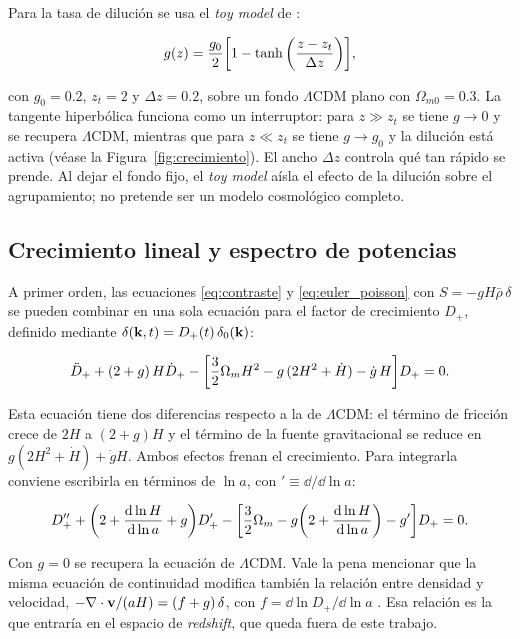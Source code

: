\documentclass[letterpaper, 12pt]{article}
\newcommand{\LCDM}{\Lambda\mathrm{CDM}}
\begin{document}
            Para la tasa de dilución se usa el \emph{toy model} de \cite{aviles_ferrara}:

            \begin{equation}\label{eq:toy}
                g(z) = \frac{g_0}{2}\qty[1 - \tanh\qty(\frac{z - z_t}{\Delta z})],
            \end{equation}

            con $g_0 = 0.2$, $z_t = 2$ y $\Delta z = 0.2$, sobre un fondo $\LCDM$ plano con $\Omega_{m0} = 0.3$. La tangente hiperbólica funciona como un interruptor: para $z \gg z_t$ se tiene $g \to 0$ y se recupera $\LCDM$, mientras que para $z \ll z_t$ se tiene $g \to g_0$ y la dilución está activa (véase la Figura~\ref{fig:crecimiento}). El ancho $\Delta z$ controla qué tan rápido se prende. Al dejar el fondo fijo, el \emph{toy model} aísla el efecto de la dilución sobre el agrupamiento; no pretende ser un modelo cosmológico completo.

        \subsection{Crecimiento lineal y espectro de potencias}

            A primer orden, las ecuaciones \eqref{eq:contraste} y \eqref{eq:euler_poisson} con $S = -gH\bar\rho\,\delta$ se pueden combinar en una sola ecuación para el factor de crecimiento $D_+$, definido mediante $\delta(\vb{k},t) = D_+(t)\,\delta_0(\vb{k})$:

            \begin{equation}\label{eq:crecimiento_t}
                \ddot D_+ + (2+g)\,H\dot D_+ - \qty[\frac{3}{2}\Omega_m H^2 - g\,(2H^2 + \dot H) - \dot g\,H] D_+ = 0.
            \end{equation}

            Esta ecuación tiene dos diferencias respecto a la de $\LCDM$: el término de fricción crece de $2H$ a $(2+g)H$ y el término de la fuente gravitacional se reduce en $g(2H^2 + \dot H) + \dot g H$. Ambos efectos frenan el crecimiento. Para integrarla conviene escribirla en términos de $\ln a$, con $' \equiv \dd/\dd\ln a$:

            \begin{equation}\label{eq:crecimiento_lna}
                D_+'' + \qty(2 + \dv{\ln H}{\ln a} + g)D_+' - \qty[\frac{3}{2}\Omega_m - g\qty(2 + \dv{\ln H}{\ln a}) - g'] D_+ = 0.
            \end{equation}

            Con $g = 0$ se recupera la ecuación de $\LCDM$. Vale la pena mencionar que la misma ecuación de continuidad modifica también la relación entre densidad y velocidad, $-\nabla\cdot\vb{v}/(aH) = (f + g)\,\delta$, con $f = \dd\ln D_+/\dd\ln a$ \cite{aviles_ferrara}. Esa relación es la que entraría en el espacio de \emph{redshift}, que queda fuera de este trabajo.
\end{document}

